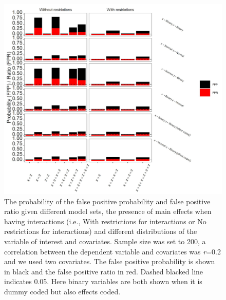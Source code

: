 \begin{figure}[hbt!]
\includegraphics[scale=0.95]{R/Analysis/Result/Figures/Figure1ASI.jpeg}
\centering
\caption{The probability of the false positive probability and false positive ratio given different model sets, the presence of main effects when having interactions (i.e., With restrictions for interactions or No restrictions for interactions) and different distributions of the variable of interest and covariates. Sample size was set to 200, a correlation between the dependent variable and covariates was \textit{r}=0.2 and we used two covariates. The false positive probability is shown in black and the false positive ratio in red. Dashed blacked line indicates 0.05. Here binary variables are both shown when it is dummy coded but also effects coded.}
\label{fig:appfigure1}
\end{figure}

\begin{landscape}

\end{landscape}




